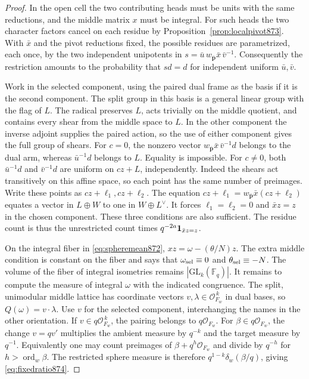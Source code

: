 \documentclass[a4paper,11pt]{article}
\theoremstyle{definition}
\theoremstyle{remark}
\numberwithin{equation}{section}
\begin{document}
\begin{proof}
In the open cell the two contributing heads must be units with the
same reductions, and the middle matrix \(x\) must be integral.
For such heads the two character factors cancel on each residue by
Proposition~\ref{prop:localpivot873}. With \(\bar x\) and the pivot
reductions fixed, the possible residues are parametrized, each once, by
the two independent unipotents in
\(s=\bar u\,w_{\bar{\mathbf p}}\bar x\,\bar v^{-1}\).
Consequently the restriction amounts to the probability that \(s d=d\)
for independent uniform \(\bar u,\bar v\).

Work in the selected component, using the paired dual frame as the
basis if it is the second component. The split group in this basis is
a general linear group with the flag of \(L\). The radical preserves
\(L\), acts trivially on the middle quotient, and contains every shear
from the middle space to \(L\). In the other component the inverse
adjoint supplies the paired action, so the use of either component gives
the full group of shears. For \(c=0\), the nonzero vector
\(w_{\bar{\mathbf p}}\bar x\,\bar v^{-1}d\) belongs to the dual arm,
whereas \(\bar u^{-1}d\) belongs to \(L\). Equality is impossible.
For \(c\ne0\), both \(\bar u^{-1}d\) and \(\bar v^{-1}d\) are uniform
on \(cz+L\), independently. Indeed the shears act transitively on
this affine space, so each point has the same number of preimages.
Write these points as \(cz+\ell_1,cz+\ell_2\). The equation
\(cz+\ell_1=w_{\bar{\mathbf p}}\bar x(cz+\ell_2)\) equates a vector in
\(L\oplus W\) to one in \(W\oplus L^\vee\). It forces
\(\ell_1=\ell_2=0\) and \(\bar x z=z\) in the chosen component. These
three conditions are also sufficient. The residue count is thus the
unrestricted count times \(q^{-2a}{\bf1}_{\bar x z=z}\).

On the integral fiber in \eqref{eq:spheremean872},
\(xz=\omega-(\theta/N)z\). The extra middle condition is constant on
the fiber and says that \(\omega_{\rm sel}\equiv0\) and
\(\theta_{\rm sel}\equiv-N\). The volume of the fiber of integral
isometries remains \(|\mathrm{GL}_k(\mathbb F_q)|\). It remains to
compute the measure of integral \(\omega\) with the indicated
congruence. The split, unimodular middle lattice has coordinate
vectors \(v,\lambda\in\mathcal O_{F_w}^{\,k}\) in dual bases, so
\(Q(\omega)=v\cdot\lambda\). Use \(v\) for the selected component,
interchanging the names in the other orientation. If
\(v\in q\mathcal O_{F_w}^{\,k}\), the pairing belongs to
\(q\mathcal O_{F_w}\). For \(\beta\in q\mathcal O_{F_w}\), the change
\(v=qv'\) multiplies the ambient measure by \(q^{-k}\) and the
target measure by \(q^{-1}\). Equivalently one may count preimages
of \(\beta+q^h\mathcal O_{F_w}\) and divide by \(q^{-h}\) for
\(h>\operatorname{ord}_w\beta\). The restricted sphere measure is
therefore \(q^{1-k}\delta_w(\beta/q)\), giving
\eqref{eq:fixedratio874}.


\end{proof}
\end{document}
